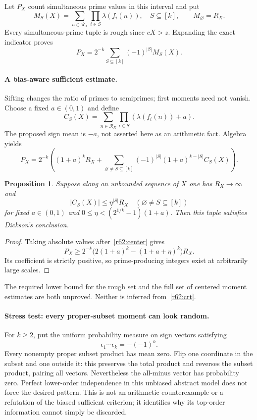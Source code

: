 \documentclass[11pt,a4paper]{article}
\newtheorem{notebookproposition}[notebooklemma]{Proposition}
\numberwithin{equation}{section}
\begin{document}
Let $P_X$ count simultaneous prime values in this interval and put
\[
 M_S(X)=\sum_{n\in\mathcal R_X}\prod_{i\in S}\lambda(f_i(n)),
 \quad S\subseteq[k],\qquad M_\varnothing=R_X.
\]
Every simultaneous-prime tuple is rough since $cX>z$. Expanding the exact indicator proves
\begin{equation}\label{r62:exact}
 P_X=2^{-k}\sum_{S\subseteq[k]}(-1)^{|S|}M_S(X).
\end{equation}

\paragraph{A bias-aware sufficient estimate.}
Sifting changes the ratio of primes to semiprimes; first moments need not vanish. Choose a fixed $a\in(0,1)$ and define
\[
 C_S(X)=\sum_{n\in\mathcal R_X}\prod_{i\in S}(\lambda(f_i(n))+a).
\]
The proposed sign mean is $-a$, not asserted here as an arithmetic fact. Algebra yields
\begin{equation}\label{r62:center}
 P_X=2^{-k}\left((1+a)^kR_X+
 \sum_{\varnothing\ne S\subseteq[k]}(-1)^{|S|}(1+a)^{k-|S|}C_S(X)\right).
\end{equation}
\begin{notebookproposition}\label{r62:criterion}
Suppose along an unbounded sequence of $X$ one has $R_X\to\infty$ and
\[
 |C_S(X)|\le\eta^{|S|}R_X\quad(\varnothing\ne S\subseteq[k])
\]
for fixed $a\in(0,1)$ and $0\le\eta<(2^{1/k}-1)(1+a)$. Then this tuple satisfies Dickson's conclusion.
\end{notebookproposition}
\begin{proof}
Taking absolute values after~\eqref{r62:center} gives
\[
 P_X\ge2^{-k}\bigl(2(1+a)^k-(1+a+\eta)^k\bigr)R_X.
\]
Its coefficient is strictly positive, so prime-producing integers exist at arbitrarily large scales.
\end{proof}
The required lower bound for the rough set and the full set of centered moment estimates are both unproved. Neither is inferred from~\eqref{r62:crt}.

\paragraph{Stress test: every proper-subset moment can look random.}
For $k\ge2$, put the uniform probability measure on sign vectors satisfying
\[
 \epsilon_1\cdots\epsilon_k=-(-1)^k.
\]
Every nonempty proper subset product has mean zero. Flip one coordinate in the subset and one outside it: this preserves the total product and reverses the subset product, pairing all vectors. Nevertheless the all-minus vector has probability zero. Perfect lower-order independence in this unbiased abstract model does not force the desired pattern. This is not an arithmetic counterexample or a refutation of the biased sufficient criterion; it identifies why its top-order information cannot simply be discarded.
\end{document}
